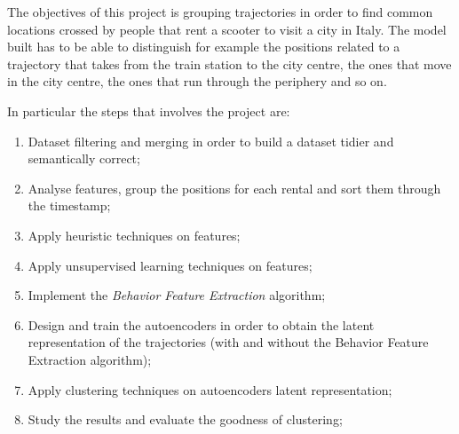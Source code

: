 The objectives of this project is grouping trajectories in order to find common locations crossed by people that rent a scooter to visit a city in Italy. The model built has to be able to distinguish for example the positions related to a trajectory that takes from the train station to the city centre, the ones that move in the city centre, the ones that run through the periphery and so on.

In particular the steps that involves the project are:
\begin{enumerate}
	\item Dataset filtering and merging in order to build a dataset tidier and semantically correct;
	\item Analyse features, group the positions for each rental and sort them through the timestamp;
	\item Apply heuristic techniques on features;
	\item Apply unsupervised learning techniques on features;  
	\item Implement the \textit{Behavior Feature Extraction} algorithm;
	\item Design and train the autoencoders in order to obtain the latent representation of the trajectories (with and without the Behavior Feature Extraction algorithm);
	\item Apply clustering techniques on autoencoders latent representation;
	\item Study the results and evaluate the goodness of clustering;
\end{enumerate}
